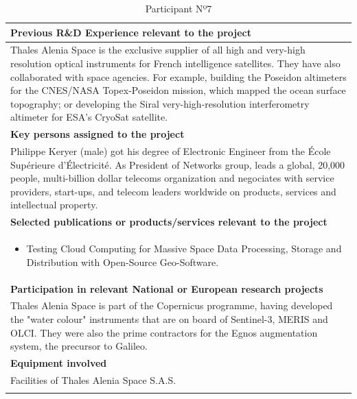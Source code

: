 \begin{longtable}[H]{|p{0.7cm}|p{4cm}|p{7cm}|p{1.3cm}|}
	\multicolumn{4}{|p{13cm}|}{\textbf{Previous R\&D Experience relevant to the project}}  \\ \hline
	
	\multicolumn{4}{|p{14.5cm}|}{Thales Alenia Space is the exclusive supplier of all high and very-high resolution optical instruments for French intelligence satellites. They have also collaborated with space agencies. For example, building the Poseidon altimeters for the CNES/NASA Topex-Poseidon mission, which mapped the ocean surface topography; or developing the Siral very-high-resolution interferometry altimeter for ESA's CryoSat satellite.}  \\ \hline
	
	\multicolumn{4}{|p{13cm}|}{\textbf{Key persons assigned to the project}}   \\ \hline
	
	\multicolumn{4}{|p{14.5cm}|}{Philippe Keryer (male) got his degree of Electronic Engineer from the École Supérieure d'Électricité. As President of Networks group, leads a global, 20,000 people, multi-billion dollar telecoms organization and negociates with service providers, start-ups, and telecom leaders worldwide on products, services and intellectual property.}  \\ \hline
	
	\multicolumn{4}{|p{13cm}|}{\textbf{Selected publications or products/services relevant to the project}}  \\ \hline
	
	\multicolumn{4}{|p{14.5cm}|}{
	\begin{itemize}
		\item \vspace{-0.5cm}Testing Cloud Computing for Massive Space Data Processing, Storage and Distribution with Open-Source Geo-Software.\vspace{-0.3cm}
	\end{itemize}}  \\ \hline
	
	\multicolumn{4}{|p{13cm}|}{\textbf{Participation in relevant National or European research projects}}  \\ \hline
	
	\multicolumn{4}{|p{14.5cm}|}{Thales Alenia Space is part of the Copernicus programme, having developed the "water colour" instruments that are on board of Sentinel-3, MERIS and OLCI. They were also the prime contractors for the Egnos augmentation system, the precursor to Galileo.}  \\ \hline
	
	\multicolumn{4}{|p{13cm}|}{\textbf{Equipment involved}}  \\ \hline
	
	\multicolumn{4}{|p{14.5cm}|}{Facilities of Thales Alenia Space S.A.S.}  \\ \hline
	\caption{Participant Nº7}
\end{longtable}



